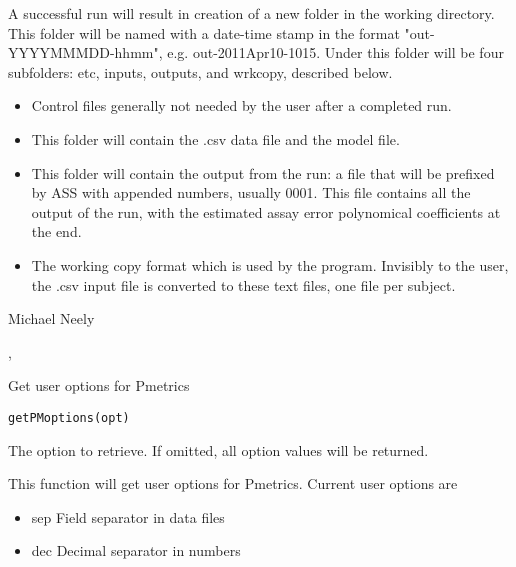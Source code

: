 \documentclass[a4paper]{book}
\begin{document}
%
\begin{Value}
A successful  run will result in creation of a new folder in the working
directory.  This folder will be named with a date-time stamp in the format "out-YYYYMMMDD-hhmm",
e.g. out-2011Apr10-1015.  Under this folder will be four subfolders: etc, inputs, outputs, and
wrkcopy, described below.
\begin{itemize}

\item{}    Control files generally not needed by the user after a completed run.
\item{}    This folder will contain the .csv data file and the model file.
\item{}    This folder will contain the output from the run: a file that will be
prefixed by ASS with appended numbers, usually 0001. This file contains all the output of the
run, with the estimated assay error polynomical coefficients at the end.
\item{}     The working copy format which is used by the program.  Invisibly to the user,
the .csv input file is converted to these text files, one file per subject.  

\end{itemize}

\end{Value}
%
\begin{Author}\relax
Michael Neely
\end{Author}
%
\begin{SeeAlso}\relax
{}, 
\end{SeeAlso}
%
\begin{Description}\relax
Get user options for Pmetrics
\end{Description}
%
\begin{Usage}
\begin{verbatim}
getPMoptions(opt)
\end{verbatim}
\end{Usage}
%
\begin{Arguments}
\begin{ldescription}
\item[\code{opt}] The option to retrieve.  If omitted, all option values will be returned.
\end{ldescription}
\end{Arguments}
%
\begin{Details}\relax
This function will get user options for Pmetrics.  Current user options are
\begin{itemize}

\item{} sep Field separator in data files
\item{} dec Decimal separator in numbers

\end{itemize}

\end{Details}
\end{document}
